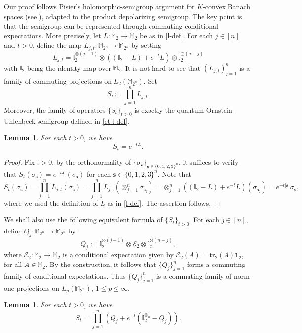 \documentclass{amsbook}
\newtheorem{lemma}[theorem]{Lemma}
\theoremstyle{definition}
\theoremstyle{remark}
\numberwithin{section}{chapter}
\numberwithin{equation}{chapter}
\newcommand{\1}{\mathbf{1}}
\newcommand{\s}{\mathbf{s}}
\newcommand{\tr}{\mathrm{tr}}
\begin{document}
Our proof follows Pisier's holomorphic-semigroup argument for $K$-convex Banach spaces (see \cite{Pi1982}), adapted to the product depolarizing semigroup. The key point is that the semigroup can be represented through commuting conditional expectations. More precisely, let $L:\mathbb{M}_2\to \mathbb{M}_2$ be as in  \eqref{l-def}. For each $j\in [n]$ and $t>0$, define the map $L_{j,t}:\mathbb{M}_{2^n}\rightarrow\mathbb{M}_{2^n}$ by setting
$$L_{j,t}=\mathbb{I}_2^{\otimes (j-1)} \otimes ((\mathbb{I}_2 - L)+e^{-t}L) \otimes \mathbb{I}_2^{\otimes (n-j)}$$
with $\mathbb{I}_2$ being the identity map over $\mathbb{M}_{2}$. It is not hard to see that $(L_{j,t})_{j=1}^n$ is a family of commuting projections on $L_2(\mathbb{M}_{2^n})$.
Set
\[
S_t\coloneqq \prod_{j=1}^nL_{j,t}.
\]
Moreover, the family of operators $\{S_{t}\}_{t>0}$ is exactly the quantum Ornstein-Uhlenbeck semigroup defined in \eqref{et-l-def}.
\begin{lemma}\label{st-e-tl}
For each $t>0$, we have
\begin{equation*}
S_t=e^{-t\mathcal{L}}.
\end{equation*}
\end{lemma}
\begin{proof}
Fix $t>0$, by the orthonormality of $\{\sigma_{\mathbf{s}}\}_{\s\in\{0,1,2,3\}^{n}}$, it suffices to verify that $S_{t}(\sigma_{\s})=e^{-t\mathcal{L}}(\sigma_{\s})$ for each $\s\in \{0,1,2,3\}^{n}$. Note that
\[
S_t(\sigma_{\mathbf{s}})=\prod_{j=1}^nL_{j,t}(\sigma_{\mathbf{s}})=\prod_{j=1}^nL_{j,t}(\otimes_{j=1}^n\sigma_{\mathbf{s}_j})=\otimes_{j=1}^n((\mathbb{I}_2-L)+e^{-t}L)(\sigma_{\mathbf{s}_j})=e^{-t|\s|}\sigma_\s,
\]
where we used the  definition of $L$ as in \eqref{l-def}. The assertion follows.
\end{proof}

We shall also use the following equivalent formula of $\{S_t\}_{t>0}$. For each $j\in [n]$, define $Q_j:\mathbb{M}_{2^n}\to \mathbb{M}_{2^n}$ by 
$$Q_j:=\mathbb{I}_2^{\otimes (j-1)} \otimes \mathcal{E}_2 \otimes \mathbb{I}_2^{\otimes (n-j)},$$
where $\mathcal{E}_2:\mathbb{M}_2\to\mathbb{M}_2$ is a conditional expectation given by $\mathcal{E}_2(A)=\tr_2(A)\mathbf{1}_2$, for all $A\in \mathbb{M}_2$.
By the construction, it follows that $\{Q_j\}_{j=1}^n$ forms a commuting family of conditional expectations. Thus $\{Q_{j}\}_{j=1}^n$ is a commuting family of norm-one projections on $L_{p}(\mathbb{M}_{2^n})$, $1\leq p\leq\infty$.

\begin{lemma}\label{lem-st-2}
For each $t>0$, we have
\[
S_t=\prod_{j=1}^{n}\left(Q_j+e^{-t}\left(\mathbb{I}_2^{\otimes_n}-Q_j\right)\right).
\]
\end{lemma}
\end{document}
